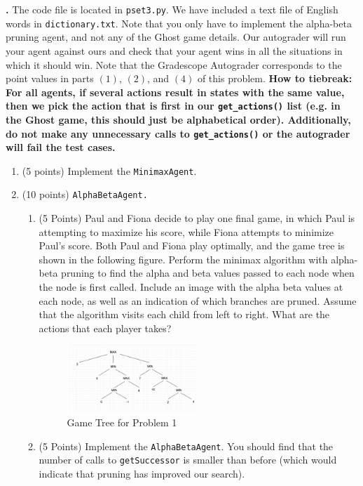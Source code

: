 \documentclass[12pt]{amsart}
\newenvironment{statement}[1]{\smallskip\noindent\color[rgb]{0.0,0.0,0.0} {\bf #1.}}{}
\newcommand{\1}{\mathds{1}}
\begin{document}
\begin{statement}{5}
\noindent
The code file is located in \texttt{pset3.py}. We have included a text file of English words in \texttt{dictionary.txt}. Note that you only have to implement the alpha-beta pruning agent, and not any of the Ghost game details. Our autograder will run your agent against ours and check that your agent wins in all the situations in which it should win. Note that the Gradescope Autograder corresponds to the point values in parts $(1)$, $(2)$, and $(4)$ of this problem.
\textbf{How to tiebreak: For all agents, if several actions result in states with the same value, then we pick the action that is first in our \texttt{get\_actions()} list (e.g. in the Ghost game, this should just be alphabetical order). Additionally, do not make any unnecessary calls to \texttt{get\_actions()} or the autograder will fail the test cases.}
\begin{enumerate}
    \item (5 points) Implement the \texttt{MinimaxAgent}.
    \item (10 points) \texttt{AlphaBetaAgent.} \begin{enumerate}
        \item (5 Points) Paul and Fiona decide to play one final game, in which Paul is attempting to maximize his score, while Fiona attempts to minimize Paul's score. Both Paul and Fiona play optimally, and the game tree is shown in the following figure. Perform the minimax algorithm with alpha-beta pruning to find the alpha and beta values passed to each node when the node is first called. Include an image with the alpha beta values at each node, as well as an indication of which branches are pruned. Assume that the algorithm visits each child from left to right. What are the actions that each player takes?
\vspace{-3mm}
 \begin{figure}[H]
        \centering
        \includegraphics[width=0.5\textwidth]{alpha-beta.png}
        \vspace{-5mm}
        \caption{Game Tree for Problem 1}
\end{figure}
\vspace{-5mm}
        \item (5 Points) Implement the \texttt{AlphaBetaAgent}. You should find that the number of calls to \texttt{getSuccessor} is smaller than before (which would indicate that pruning has improved our search).

\end{enumerate}
\end{enumerate}
\end{statement}
\end{document}
